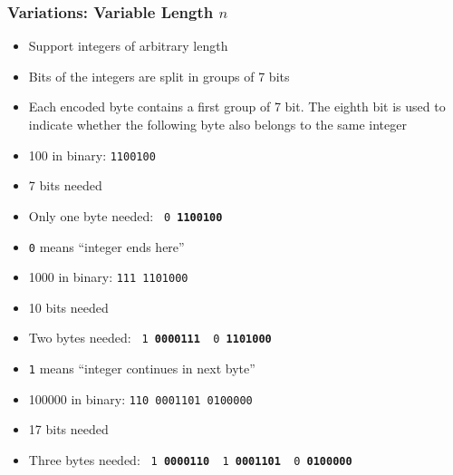 \documentclass{../ucll-slides}
\begin{document}
\begin{frame}
  \frametitle{Variations: Variable Length $n$}
  \begin{itemize}
    \item Support integers of arbitrary length
    \item Bits of the integers are split in groups of 7 bits
    \item Each encoded byte contains a first group of 7 bit. The eighth bit is used to indicate whether
          the following byte also belongs to the same integer
  \end{itemize}
  \begin{overprint}
    \begin{itemize}
      \item 100 in binary: \texttt{1100100}
      \item 7 bits needed
      \item Only one byte needed: \texttt{{\color{red} 0}\kern1pt {\bfseries 1100100}}
      \item {\color{red}\tt 0} means ``integer ends here''
    \end{itemize}

    \begin{itemize}
      \item 1000 in binary: \texttt{111\kern2pt 1101000}
      \item 10 bits needed
      \item Two bytes needed: \texttt{{\color{red} 1}\kern1pt {\bfseries 0000111} {\color{red} 0}\kern1pt {\bfseries 1101000}}
      \item {\color{red}\tt 1} means ``integer continues in next byte''
    \end{itemize}

    \begin{itemize}
      \item 100000 in binary: \texttt{110\kern2pt 0001101\kern2pt 0100000}
      \item 17 bits needed
      \item Three bytes needed: \texttt{{\color{red} 1}\kern1pt {\bfseries 0000110} {\color{red} 1}\kern1pt {\bfseries 0001101} {\color{red} 0}\kern1pt {\bfseries 0100000}}
    \end{itemize}
  \end{overprint}
\end{frame}
\end{document}
